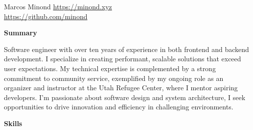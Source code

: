 \documentclass[10pt]{article}
\newcommand{\SectionTitle}[2][.2in] {
  \vspace{#1}
  \textbf{\large #2}
  \vspace{.1in}
}
\begin{document}
\begin{flushleft}

\huge{Marcos Minond} \normalsize
\hfill \href{https://minond.xyz}{https://minond.xyz} \\
\hfill \href{https://github.com/minond}{https://github.com/minond}

\normalsize


\SectionTitle[.025in]{Summary}

Software engineer with over ten years of experience in both frontend and backend development. I specialize in creating performant, scalable solutions that exceed user expectations. My technical expertise is complemented by a strong commitment to community service, exemplified by my ongoing role as an organizer and instructor at the Utah Refugee Center, where I mentor aspiring developers. I'm passionate about software design and system architecture, I seek opportunities to drive innovation and efficiency in challenging environments.


%

\SectionTitle{Skills}



\end{flushleft}
\end{document}
